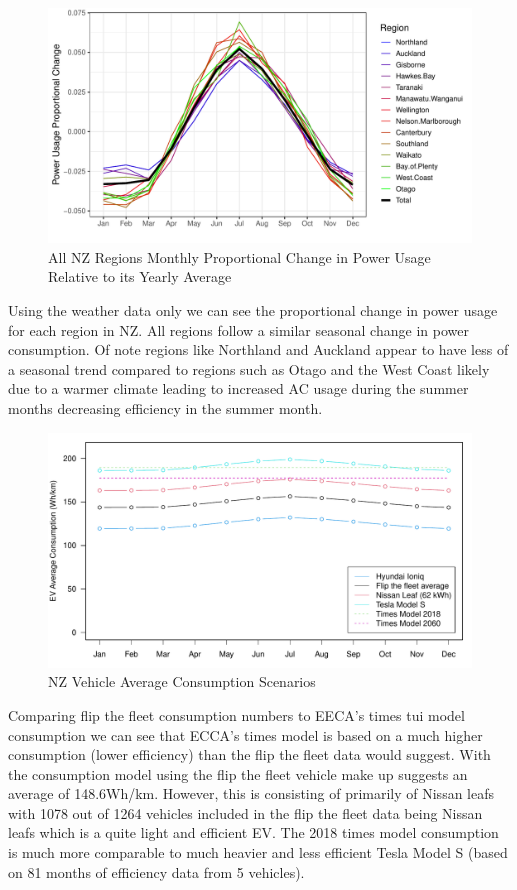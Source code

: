 \documentclass[
]{article}
\begin{document}
\begin{figure}
\centering
\includegraphics{summary_week4_files/figure-latex/NZ_region_power_prop-1.pdf}
\caption{All NZ Regions Monthly Proportional Change in Power Usage
Relative to its Yearly Average}
\end{figure}

Using the weather data only we can see the proportional change in power
usage for each region in NZ. All regions follow a similar seasonal
change in power consumption. Of note regions like Northland and Auckland
appear to have less of a seasonal trend compared to regions such as
Otago and the West Coast likely due to a warmer climate leading to
increased AC usage during the summer months decreasing efficiency in the
summer month.

\begin{figure}
\centering
\includegraphics{summary_week4_files/figure-latex/vehicle_consum-1.pdf}
\caption{NZ Vehicle Average Consumption
Scenarios\label{fig:vehicle_consum}}
\end{figure}

Comparing flip the fleet consumption numbers to EECA's times tui model
\cite{times_model} consumption we can see that ECCA's times model is
based on a much higher consumption (lower efficiency) than the flip the
fleet data would suggest. With the consumption model using the flip the
fleet vehicle make up suggests an average of 148.6Wh/km. However, this
is consisting of primarily of Nissan leafs with 1078 out of 1264
vehicles included in the flip the fleet data being Nissan leafs which is
a quite light and efficient EV. The 2018 times model consumption is much
more comparable to much heavier and less efficient Tesla Model S (based
on 81 months of efficiency data from 5 vehicles).
\end{document}
